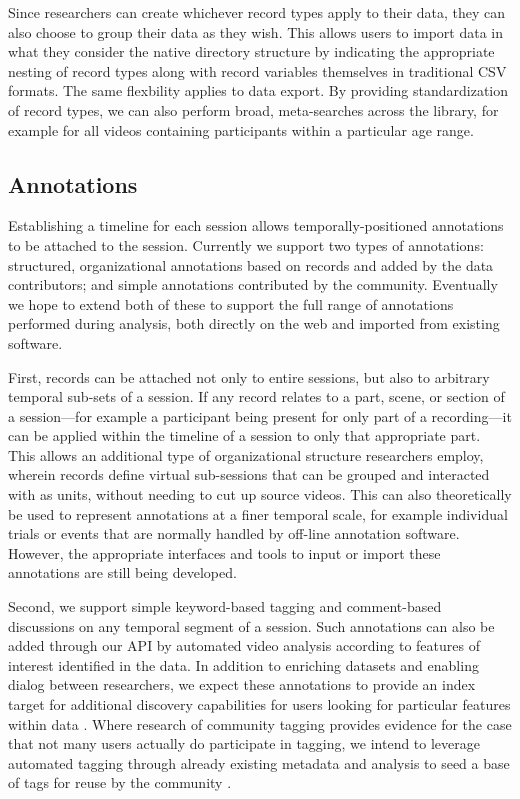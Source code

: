 \documentclass{sig-alternate}
\begin{document}
Since researchers can create whichever record types apply to their data, they can also choose to group their data as they wish.
This allows users to import data in what they consider the native directory structure by indicating the appropriate nesting of record types along with record variables themselves in traditional CSV formats. 
The same flexbility applies to data export.
By providing standardization of record types, we can also perform broad, meta-searches across the library, for example for all videos containing participants within a particular age range.

\subsection{Annotations}

Establishing a timeline for each session allows temporally-positioned annotations to be attached to the session.
Currently we support two types of annotations: structured, organizational annotations based on records and added by the data contributors; and simple annotations contributed by the community.
Eventually we hope to extend both of these to support the full range of annotations performed during analysis, both directly on the web and imported from existing software.

First, records can be attached not only to entire sessions, but also to arbitrary temporal sub-sets of a session.
If any record relates to a part, scene, or section of a session---for example a participant being present for only part of a recording---it can be applied within the timeline of a session to only that appropriate part.
This allows an additional type of organizational structure researchers employ, wherein records define virtual sub-sessions that can be grouped and interacted with as units, without needing to cut up source videos.
This can also theoretically be used to represent annotations at a finer temporal scale, for example individual trials or events that are normally handled by off-line annotation software.
However, the appropriate interfaces and tools to input or import these annotations are still being developed.

Second, we support simple keyword-based tagging and comment-based discussions on any temporal segment of a session.
Such annotations can also be added through our API by automated video analysis according to features of interest identified in the data.
In addition to enriching datasets and enabling dialog between researchers, we expect these annotations to provide an index target for additional discovery capabilities for users looking for particular features within data \cite{Lanagan_Smeaton_2012}. Where research of community tagging provides evidence for the case that not many users actually do participate in tagging, we intend to leverage automated tagging through already existing metadata and analysis to seed a base of tags for reuse by the community \cite{Yang_Lu_Giles_2011, Farooq_etal_2007}.
\end{document}
